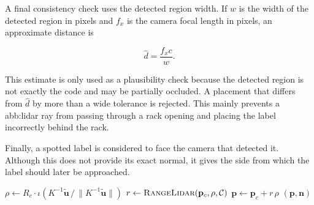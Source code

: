 \FloatBarrier

A final consistency check uses the detected region width. If $w$ is the width of
the detected region in pixels and $f_x$ is the camera focal length in pixels, an
approximate distance is

\[
    \hat{d} = \frac{f_x c}{w}.
\]

This estimate is only used as a plausibility check because the detected region is
not exactly the  code and may be partially occluded. A
placement that differs from $\hat{d}$ by more than a wide tolerance is rejected.
This mainly prevents a \gls{abb:lidar} ray from passing through a rack opening
and placing the label incorrectly behind the rack.

Finally, a spotted label is considered to face the camera that detected it.
Although this does not provide its exact normal, it gives the side from which the
label should later be approached.

\begin{algorithm}[!htb]
    \caption{PlaceObservation}%
    \label{algo:sys:place}
    $\rho \gets R_c \cdot \iota\!\left( K^{-1}\tilde{\mathbf{u}} \,/\, \lVert K^{-1}\tilde{\mathbf{u}} \rVert \right)$ 
    $r \gets \textsc{RangeLidar}(\mathbf{p}_c, \rho, \mathcal{C})$\;
    $\mathbf{p} \gets \mathbf{p}_c + r\,\rho$\;
    \KwRet$(\mathbf{p}, \mathbf{n})$\;
\end{algorithm}

